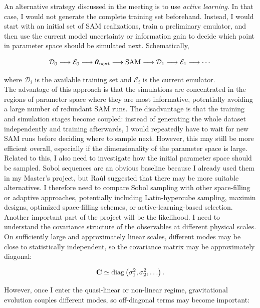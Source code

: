 \documentclass[10.9pt,a4paper,twoside]{article}
\begin{document}
An alternative strategy discussed in the meeting is to use \emph{active learning}. In that case, I would not generate the complete training set beforehand. Instead, I would start with an initial set of SAM realizations, train a preliminary emulator, and then use the current model uncertainty or information gain to decide which point in parameter space should be simulated next. Schematically,

\[
\mathcal{D}_0
\longrightarrow
\mathcal{E}_0
\longrightarrow
\boldsymbol{\theta}_{\rm next}
\longrightarrow
{\rm SAM}
\longrightarrow
\mathcal{D}_1
\longrightarrow
\mathcal{E}_1
\longrightarrow
\cdots
\]

where $\mathcal{D}_i$ is the available training set and $\mathcal{E}_i$ is the current emulator. \\

The advantage of this approach is that the simulations are concentrated in the regions of parameter space where they are most informative, potentially avoiding a large number of redundant SAM runs. The disadvantage is that the training and simulation stages become coupled: instead of generating the whole dataset independently and training afterwards, I would repeatedly have to wait for new SAM runs before deciding where to sample next. However, this may still be more efficient overall, especially if the dimensionality of the parameter space is large. \\

Related to this, I also need to investigate how the initial parameter space should be sampled. Sobol sequences are an obvious baseline because I already used them in my Master's project, but Raúl suggested that there may be more suitable alternatives. I therefore need to compare Sobol sampling with other space-filling or adaptive approaches, potentially including Latin-hypercube sampling, maximin designs, optimized space-filling schemes, or active-learning-based selection. \\

Another important part of the project will be the likelihood. I need to understand the covariance structure of the observables at different physical scales. On sufficiently large and approximately linear scales, different modes may be close to statistically independent, so the covariance matrix may be approximately diagonal:

\[
\mathbf{C}
\simeq
{\rm diag}
\left(
\sigma_1^2,
\sigma_2^2,
\ldots
\right).
\]

However, once I enter the quasi-linear or non-linear regime, gravitational evolution couples different modes, so off-diagonal terms may become important:
\end{document}
